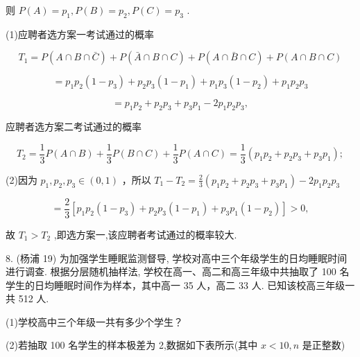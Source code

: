\documentclass[10pt]{article}
\begin{document}
则 \(P\left( A\right)  = {p}_{1},P\left( B\right)  = {p}_{2},P\left( C\right)  = {p}_{3}\) .

(1)应聘者选方案一考试通过的概率

\[
{T}_{1} = P\left( {A \cap  B \cap  \bar{C}}\right)  + P\left( {\bar{A} \cap  B \cap  C}\right)  + P\left( {A \cap  \bar{B} \cap  C}\right)  + P\left( {A \cap  B \cap  C}\right)
\]

\[
= {p}_{1}{p}_{2}\left( {1 - {p}_{3}}\right)  + {p}_{2}{p}_{3}\left( {1 - {p}_{1}}\right)  + {p}_{1}{p}_{3}\left( {1 - {p}_{2}}\right)  + {p}_{1}{p}_{2}{p}_{3}
\]

\[
= {p}_{1}{p}_{2} + {p}_{2}{p}_{3} + {p}_{3}{p}_{1} - 2{p}_{1}{p}_{2}{p}_{3},
\]

应聘者选方案二考试通过的概率

\[
{T}_{2} = \frac{1}{3}P\left( {A \cap  B}\right)  + \frac{1}{3}P\left( {B \cap  C}\right)  + \frac{1}{3}P\left( {A \cap  C}\right)  = \frac{1}{3}\left( {{p}_{1}{p}_{2} + {p}_{2}{p}_{3} + {p}_{3}{p}_{1}}\right) ;
\]

(2)因为 \({p}_{1},{p}_{2},{p}_{3} \in  \left( {0,1}\right)\) ，所以 \({T}_{1} - {T}_{2} = \frac{2}{3}\left( {{p}_{1}{p}_{2} + {p}_{2}{p}_{3} + {p}_{3}{p}_{1}}\right)  - 2{p}_{1}{p}_{2}{p}_{3}\)

\[
= \frac{2}{3}\left\lbrack  {{p}_{1}{p}_{2}\left( {1 - {p}_{3}}\right)  + {p}_{2}{p}_{3}\left( {1 - {p}_{1}}\right)  + {p}_{3}{p}_{1}\left( {1 - {p}_{2}}\right) }\right\rbrack   > 0,
\]

故 \({T}_{1} > {T}_{2}\) ,即选方案一,该应聘者考试通过的概率较大.

8. (杨浦 19) 为加强学生睡眠监测督导, 学校对高中三个年级学生的日均睡眠时间进行调查. 根据分层随机抽样法, 学校在高一、高二和高三年级中共抽取了 100 名学生的日均睡眠时间作为样本，其中高一 35 人，高二 33 人. 已知该校高三年级一共 512 人.

(1)学校高中三个年级一共有多少个学生？

(2)若抽取 100 名学生的样本极差为 2,数据如下表所示(其中 \(x < {10},n\) 是正整数)

\begin{center}
\end{center}
\end{document}
